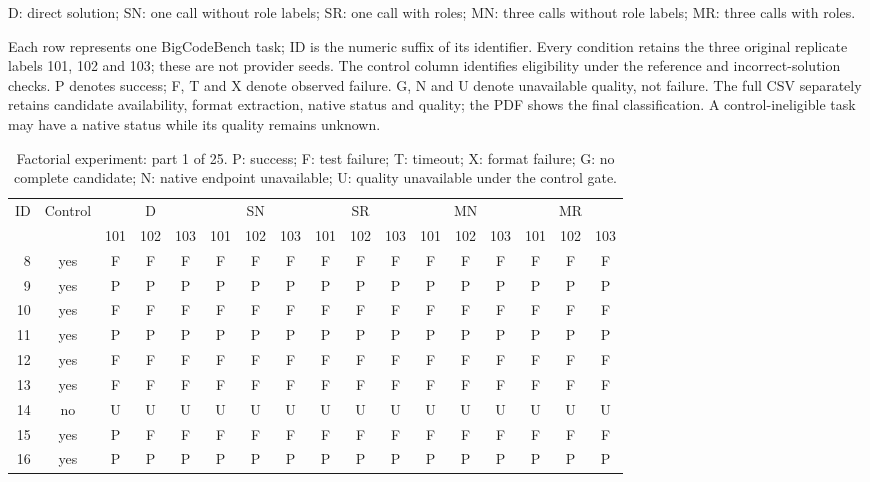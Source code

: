 D: direct solution; SN: one call without role labels; SR: one call with roles; MN: three calls without role labels; MR: three calls with roles.

Each row represents one BigCodeBench task; ID is the numeric suffix of its identifier. Every condition retains the three original replicate labels 101, 102 and 103; these are not provider seeds. The control column identifies eligibility under the reference and incorrect-solution checks. P denotes success; F, T and X denote observed failure. G, N and U denote unavailable quality, not failure. The full CSV separately retains candidate availability, format extraction, native status and quality; the PDF shows the final classification. A control-ineligible task may have a native status while its quality remains unknown.


\begin{table}[p]\centering\footnotesize
\setlength{\tabcolsep}{3pt}
\caption{Factorial experiment: part 1 of 25. P: success; F: test failure; T: timeout; X: format failure; G: no complete candidate; N: native endpoint unavailable; U: quality unavailable under the control gate.}
\begin{tabular*}{\textwidth}{@{\extracolsep{\fill}}rcccccccccccccccc}\toprule
ID & Control & \multicolumn{3}{c}{D} & \multicolumn{3}{c}{SN} & \multicolumn{3}{c}{SR} & \multicolumn{3}{c}{MN} & \multicolumn{3}{c}{MR}\\
\cmidrule(lr){3-5}\cmidrule(lr){6-8}\cmidrule(lr){9-11}\cmidrule(lr){12-14}\cmidrule(lr){15-17}
 & & 101 & 102 & 103 & 101 & 102 & 103 & 101 & 102 & 103 & 101 & 102 & 103 & 101 & 102 & 103\\\midrule
8 & yes & F & F & F & F & F & F & F & F & F & F & F & F & F & F & F\\
9 & yes & P & P & P & P & P & P & P & P & P & P & P & P & P & P & P\\
10 & yes & F & F & F & F & F & F & F & F & F & F & F & F & F & F & F\\
11 & yes & P & P & P & P & P & P & P & P & P & P & P & P & P & P & P\\
12 & yes & F & F & F & F & F & F & F & F & F & F & F & F & F & F & F\\
13 & yes & F & F & F & F & F & F & F & F & F & F & F & F & F & F & F\\
14 & no & U & U & U & U & U & U & U & U & U & U & U & U & U & U & U\\
15 & yes & P & F & F & F & F & F & F & F & F & F & F & F & F & F & F\\
16 & yes & P & P & P & P & P & P & P & P & P & P & P & P & P & P & P\\

\end{tabular*}
\end{table}
